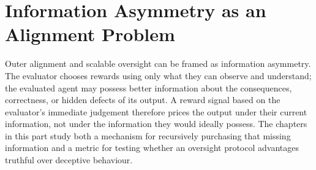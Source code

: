 \chapter{Information Asymmetry as an Alignment Problem}
\label{chap:oversight-intro}

\begin{drafttext}
Outer alignment and scalable oversight can be framed as information asymmetry.
The evaluator chooses rewards using only what they can observe and understand;
the evaluated agent may possess better information about the consequences,
correctness, or hidden defects of its output. A reward signal based on the
evaluator's immediate judgement therefore prices the output under their current
information, not under the information they would ideally possess. The chapters
in this part study both a mechanism for recursively purchasing that missing
information and a metric for testing whether an oversight protocol advantages
truthful over deceptive behaviour.
\end{drafttext}
